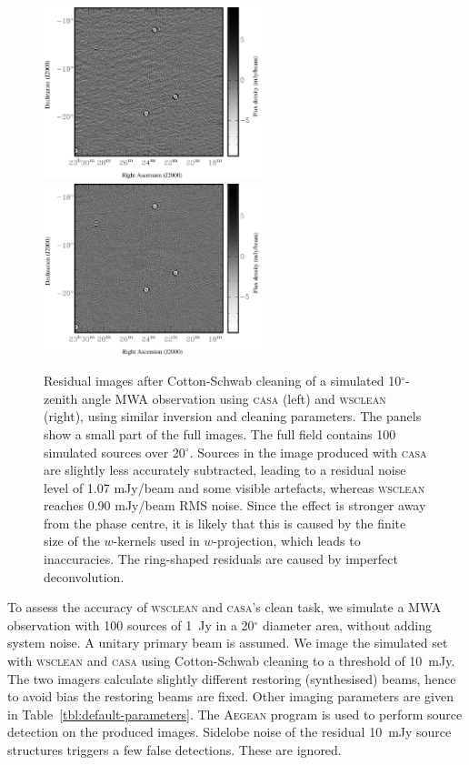 \documentclass[useAMS,usenatbib]{mn2e}
\newcommand{\degree}{\ensuremath{^{\circ}}\xspace}
\begin{document}
\begin{figure}
\begin{center}
\includegraphics[height=5cm]{img/residual-casa-fixed-grayscale}\hspace{1cm}\includegraphics[height=5cm]{img/residual-wsclean}
\caption{Residual images after Cotton-Schwab cleaning of a simulated 10\degree-zenith angle MWA observation using \textsc{casa} (left) and \textsc{wsclean} (right), using similar inversion and cleaning parameters. The panels show a small part of the full images. The full field contains 100 simulated sources over 20\degree. Sources in the image produced with \textsc{casa} are slightly less accurately subtracted, leading to a residual noise level of 1.07 mJy/beam and some visible artefacts, whereas \textsc{wsclean} reaches 0.90 mJy/beam RMS noise. Since the effect is stronger away from the phase centre, it is likely that this is caused by the finite size of the $w$-kernels used in $w$-projection, which leads to inaccuracies. The ring-shaped residuals are caused by imperfect deconvolution.}
\label{fig:residuals}
\end{center}
\end{figure}

To assess the accuracy of \textsc{wsclean} and \textsc{casa}'s clean task, we simulate a MWA observation with 100 sources of 1~Jy in a 20\degree diameter area, without adding system noise. A unitary primary beam is assumed. We image the simulated set with \textsc{wsclean} and \textsc{casa} using Cotton-Schwab cleaning to a threshold of 10~mJy. The two imagers calculate slightly different restoring (synthesised) beams, hence to avoid bias the restoring beams are fixed. Other imaging parameters are given in Table~\ref{tbl:default-parameters}. The \textsc{Aegean} program \citep{aegean-hancock-2012} is used to perform source detection on the produced images. Sidelobe noise of the residual 10~mJy source structures triggers a few false detections. These are ignored.
\end{document}
